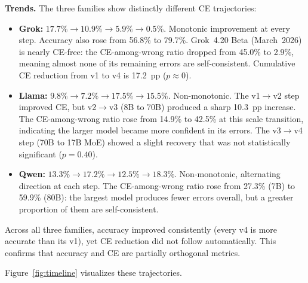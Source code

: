 \documentclass[12pt,twocolumn]{article}
\begin{document}
\textbf{Trends.}
The three families show distinctly different CE trajectories:
\begin{itemize}[nosep]
\item \textbf{Grok:} $17.7\% \to 10.9\% \to 5.9\% \to 0.5\%$.
      Monotonic improvement at every step. Accuracy also rose from
      56.8\% to 79.7\%. Grok~4.20 Beta (March~2026) is nearly
      CE-free: the CE-among-wrong ratio dropped from 45.0\% to 2.9\%,
      meaning almost none of its remaining errors are self-consistent.
      Cumulative CE reduction from v1 to v4 is 17.2~pp
      ($p \approx 0$).
\item \textbf{Llama:} $9.8\% \to 7.2\% \to 17.5\% \to 15.5\%$.
      Non-monotonic. The v1$\to$v2 step improved CE, but v2$\to$v3
      (8B to 70B) produced a sharp 10.3~pp increase. The
      CE-among-wrong ratio rose from 14.9\% to 42.5\% at this scale
      transition, indicating the larger model became more confident in
      its errors. The v3$\to$v4 step (70B to 17B MoE) showed a
      slight recovery that was not statistically significant
      ($p = 0.40$).
\item \textbf{Qwen:} $13.3\% \to 17.2\% \to 12.5\% \to 18.3\%$.
      Non-monotonic, alternating direction at each step. The
      CE-among-wrong ratio rose from 27.3\% (7B) to 59.9\% (80B):
      the largest model produces fewer errors overall, but a greater
      proportion of them are self-consistent.
\end{itemize}

Across all three families, accuracy improved consistently (every
v4 is more accurate than its v1), yet CE reduction did not follow
automatically. This confirms that accuracy and CE are partially
orthogonal metrics.

Figure~\ref{fig:timeline} visualizes these trajectories.
\end{document}
